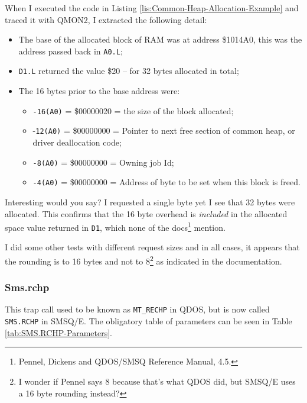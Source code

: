 When I executed the code in Listing \ref{lis:Common-Heap-Allocation-Example}
and traced it with QMON2, I extracted the following detail:
\begin{itemize}
\item The base of the allocated block of RAM was at address \$1014A0, this
was the address passed back in \texttt{A0.L};
\item \texttt{D1.L} returned the value \$20 -- for 32 bytes allocated in
total;
\item The 16 bytes prior to the base address were:
\begin{itemize}
\item \texttt{-16(A0)} = \$00000020 = the size of the block allocated;
\item -\texttt{12(A0)} = \$00000000 = Pointer to next free section of common
heap, or driver deallocation code;
\item \texttt{-8(A0)} = \$00000000 = Owning job Id;
\item \texttt{-4(A0)} = \$00000000 = Address of byte to be set when this
block is freed.
\end{itemize}
\end{itemize}
Interesting would you say? I requested a single byte yet I see that
32 bytes were allocated. This confirms that the 16 byte overhead is
\emph{included} in the allocated space value returned in \texttt{D1},
which none of the docs\footnote{Pennel, Dickens and QDOS/SMSQ Reference Manual, 4.5.}
mention. 

I did some other tests with different request sizes and in all cases,
it appears that the rounding is to 16 bytes and not to 8\footnote{I wonder if Pennel says 8 because that's what QDOS did, but SMSQ/E
uses a 16 byte rounding instead?} as indicated in the documentation.

\subsubsection{Sms.rchp}

This trap call used to be known as \texttt{MT\_RECHP} in QDOS, but
is now called \texttt{SMS.RCHP} in SMSQ/E. The obligatory table of
parameters can be seen in Table \ref{tab:SMS.RCHP-Parameters}.

